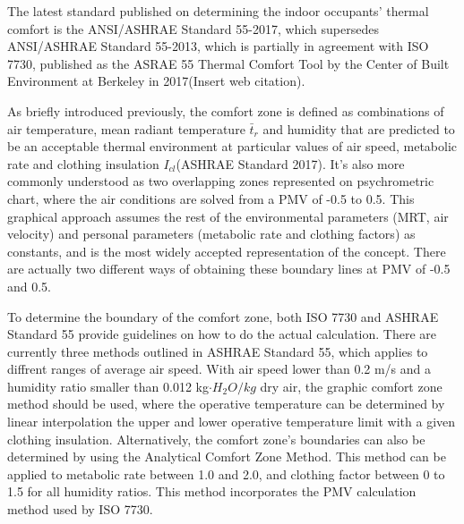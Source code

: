 		The latest standard published on determining the indoor occupants' thermal comfort is the ANSI/ASHRAE Standard 55-2017, which supersedes ANSI/ASHRAE Standard 55-2013, which is partially in agreement with ISO 7730, published as the ASRAE 55 Thermal Comfort Tool by the Center of Built Environment at Berkeley in 2017(Insert web citation).

		As briefly introduced previously, the comfort zone is defined as combinations of air temperature, mean radiant temperature $\bar t_r$  and humidity that are predicted to be an acceptable thermal environment at particular values of air speed, metabolic rate and clothing insulation $I_{cl}$(ASHRAE Standard 2017). It's also more commonly understood as two overlapping zones represented on psychrometric chart, where the air conditions are solved from a PMV of -0.5 to 0.5. This graphical approach assumes the rest of the environmental parameters (MRT, air velocity) and personal parameters (metabolic rate and clothing factors) as constants, and is the most widely accepted representation of the concept. There are actually two different ways of obtaining these boundary lines at PMV of -0.5 and 0.5. %

		To determine the boundary of the comfort zone, both ISO 7730 and ASHRAE Standard 55 provide guidelines on how to do the actual calculation. There are currently three methods outlined in ASHRAE Standard 55, which applies to diffrent ranges of average air speed. With air speed lower than 0.2 m/s and a humidity ratio smaller than 0.012 kg$\cdot H_2O/kg$ dry air, the graphic comfort zone method should be used, where the operative temperature can be determined by linear interpolation the upper and lower operative temperature limit with a given clothing insulation. Alternatively, the comfort zone's boundaries can also be determined by using the Analytical Comfort Zone Method. This method can be applied to metabolic rate between 1.0 and 2.0, and clothing factor between 0 to 1.5 for all humidity ratios. This method incorporates the PMV calculation method used by ISO 7730.

